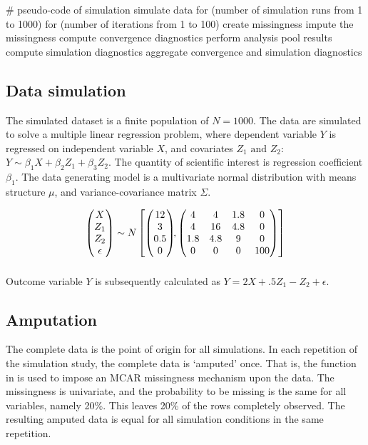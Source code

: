 \documentclass[article]{jss}
\newcommand{\fct}[1]{\code{#1()}}
\begin{document}
\begin{Code}
# pseudo-code of simulation 
simulate data 
for (number of simulation runs from 1 to 1000)
  for (number of iterations from 1 to 100)
    create missingness
    impute the missingness
    compute convergence diagnostics
    perform analysis
    pool results
    compute simulation diagnostics
aggregate convergence and simulation diagnostics
\end{Code}

\subsection{Data simulation}
The simulated dataset is a finite population of $N=1000$. The data are simulated to solve a multiple linear regression problem, where dependent variable $Y$ is regressed on independent variable $X$, and covariates $Z_1 \text{ and } Z_2$: $Y \sim \beta_1 X + \beta_2 Z_1 + \beta_3 Z_2$. The quantity of scientific interest is regression coefficient $\beta_1$. The data generating model is a multivariate normal distribution with means structure $\mu$, and variance-covariance matrix $\Sigma$. 

\begin{align*}
\begin{pmatrix}X\\
Z_{1}\\
Z_{2}\\
\epsilon
\end{pmatrix} \sim  N
\begin{bmatrix}
\begin{pmatrix}
12\\
3\\
0.5\\
0
\end{pmatrix}\!\!,
\begin{pmatrix}
4 & 4 & 1.8 & 0\\
4 & 16 & 4.8 & 0\\
1.8 & 4.8 & 9 & 0\\
0 & 0 & 0 & 100
\end{pmatrix}
\end{bmatrix}\\[2\jot]
\end{align*}

Outcome variable $Y$ is subsequently calculated as $Y =  2X + .5Z_1 - Z_2 + \epsilon$.

\subsection{Amputation}
The complete data is the point of origin for all simulations. In each repetition of the simulation study, the complete data is `amputed' once. That is, the  function \fct{ampute} in  is used to impose an MCAR missingness mechanism upon the data. The missingness is univariate, and the probability to be missing is the same for all variables, namely 20\%. This leaves 20\% of the rows completely observed. The resulting amputed data is equal for all simulation conditions in the same repetition.%
\end{document}

